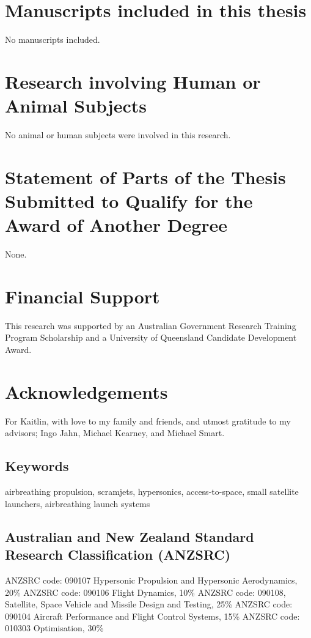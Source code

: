 \section*{Manuscripts included in this thesis}
No manuscripts included.

\section*{Research involving Human or Animal Subjects}
No animal or human subjects were involved in this research.

\section*{Statement of Parts of the Thesis Submitted to Qualify for the Award of Another Degree}

None.

\clearpage

\section*{Financial Support}
This research was supported by an Australian Government Research Training Program Scholarship and a University of Queensland Candidate Development Award.
\clearpage


\section*{Acknowledgements} 
  For Kaitlin, with love to my family and friends, and utmost gratitude to my advisors; Ingo Jahn, Michael Kearney, and Michael Smart. 

      \vspace*{\fill}


\clearpage
\subsection*{Keywords}
  airbreathing propulsion, scramjets, hypersonics, access-to-space, small satellite launchers, airbreathing launch systems

\subsection*{Australian and New Zealand Standard Research Classification (ANZSRC)}

  ANZSRC code: 090107 Hypersonic Propulsion and Hypersonic Aerodynamics, 20\% \newline
 ANZSRC code: 090106 Flight Dynamics, 10\% \newline
 ANZSRC code: 090108, Satellite, Space Vehicle and Missile Design and Testing, 25\% \newline
ANZSRC code: 090104 Aircraft Performance and Flight Control Systems, 15\% \newline
ANZSRC code: 010303 Optimisation, 30\% \newline

